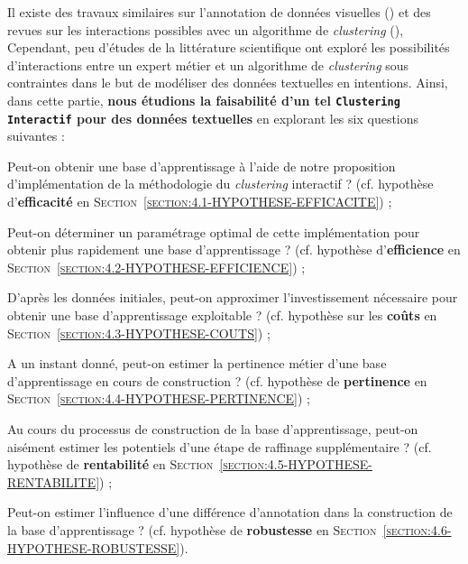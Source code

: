 	Il existe des travaux similaires sur l'annotation de données visuelles (\cite{lampert-etal:2019:constrained-distance-based}) et des revues sur les interactions possibles avec un algorithme de \textit{clustering} (\cite{bae-etal:2021:interactive-clustering-comprehensive}),
	Cependant, peu d'études de la littérature scientifique ont exploré les possibilités d'interactions entre un expert métier et un algorithme de \textit{clustering} sous contraintes dans le but de modéliser des données textuelles en intentions.
	Ainsi, dans cette partie, \textbf{nous étudions la faisabilité d'un tel \texttt{Clustering Interactif} pour des données textuelles} en explorant les six questions suivantes :
	\begin{leftBarImportantRed}
		\begin{todolist}
			\item Peut-on obtenir une base d'apprentissage à l'aide de notre proposition d'implémentation de la méthodologie du \textit{clustering} interactif ? (cf. hypothèse d'\textbf{efficacité} en \textsc{Section~\ref{section:4.1-HYPOTHESE-EFFICACITE}}) ;
			\item Peut-on déterminer un paramétrage optimal de cette implémentation pour obtenir plus rapidement une base d'apprentissage ? (cf. hypothèse d'\textbf{efficience} en \textsc{Section~\ref{section:4.2-HYPOTHESE-EFFICIENCE}}) ;
			\item D'après les données initiales, peut-on approximer l'investissement nécessaire pour obtenir une base d'apprentissage exploitable ? (cf. hypothèse sur les \textbf{coûts} en \textsc{Section~\ref{section:4.3-HYPOTHESE-COUTS}}) ;
			\item A un instant donné, peut-on estimer la pertinence métier d'une base d'apprentissage en cours de construction ? (cf. hypothèse de \textbf{pertinence} en \textsc{Section~\ref{section:4.4-HYPOTHESE-PERTINENCE}}) ;
			\item Au cours du processus de construction de la base d'apprentissage, peut-on aisément estimer les potentiels d'une étape de raffinage supplémentaire ? (cf. hypothèse de \textbf{rentabilité} en \textsc{Section~\ref{section:4.5-HYPOTHESE-RENTABILITE}}) ;
			\item Peut-on estimer l'influence d'une différence d'annotation dans la construction de la base d'apprentissage ? (cf. hypothèse de \textbf{robustesse} en \textsc{Section~\ref{section:4.6-HYPOTHESE-ROBUSTESSE}}).
		\end{todolist}
	\end{leftBarImportantRed}
	
